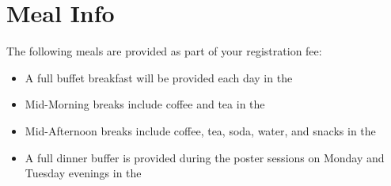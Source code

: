 \setheaders{}{}
\section{Meal Info}{}

The following meals are provided as part of your registration fee:

\begin{itemize}
\item A full buffet breakfast will be provided each day in the \BreakfastLoc
\item Mid-Morning breaks include coffee and tea in the \BreakLoc
\item Mid-Afternoon breaks include coffee, tea, soda, water, and
  snacks in the \BreakLoc
\item A full dinner buffer is provided during the poster sessions on
  Monday and Tuesday evenings in the \PosterSessionLoc
\end{itemize}

